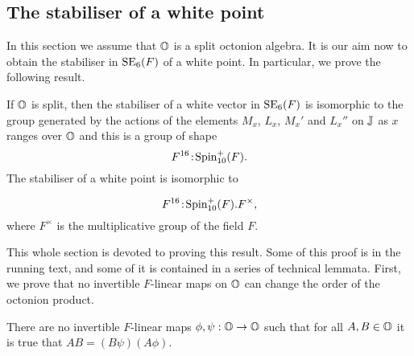 \subsection{The stabiliser of a white point}
\label{section:stabiliser}

In this section we assume that $\mathbb{O}$ is a split octonion algebra. 
It is our aim now to obtain the stabiliser in $\mathrm{SE}_6(F)$ of a white point. 
In particular, we prove the following result.

\begin{theorem}
    \label{theorem:1_white_stab}
    If $\mathbb{O}$ is split, then the stabiliser of a white vector in $\mathrm{SE}_6(F)$ is isomorphic to the group
    generated by the actions of the elements 
    $M_x$, $L_x$, $M_x'$ and $L_x''$ on $\mathbb{J}$ 
    as $x$ ranges over $\mathbb{O}$ and this is a group of shape
    \begin{equation}
        F^{16}\mathord{{\;\!{:}\;\!}}\mathrm{Spin}_{10}^+(F).
    \end{equation}
    The stabiliser of a white point is isomorphic to
    
    \begin{equation}
    	F^{16}\mathord{{\;\!{:}\;\!}}\mathrm{Spin}_{10}^+(F).F^{\times},
    \end{equation}
    where $F^{\times}$ is the multiplicative group of the field $F$. 
\end{theorem}

This whole section is devoted to proving this result. Some of this proof is in the running text,
and some of it is contained in a series of technical lemmata. First, we prove that no 
invertible $F$-linear maps on $\mathbb{O}$ can change the order of the octonion product.

\begin{lemma}
    \label{lemma:1_white_phipsi1}
    There are no invertible $F$-linear maps $\phi,\psi : \mathbb{O} \rightarrow \mathbb{O}$ such that for all
    $A,B \in \mathbb{O}$ it is true that $AB = (B\psi) (A\phi)$.
\end{lemma}

